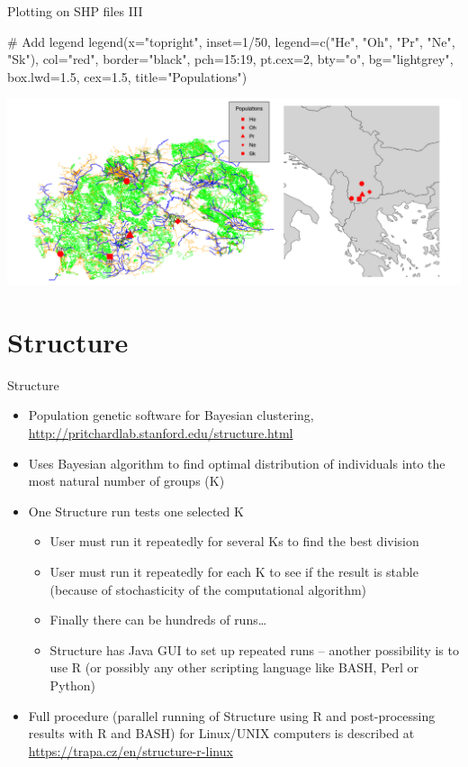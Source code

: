 \documentclass[compress, ucs, xelatex, 11pt, xcolor=svgnames,
  hyperref={
    bookmarks=true,
    unicode=true,
    colorlinks=true,
    pdftitle={Molecular data in R},
    plainpages=false,
    pdfauthor={Vojtech Zeisek},
    pdfsubject={Course about phylogeny and evolution in R},
    pdfcreator={XeLaTeX},
    pdfkeywords={R, evolution, phylogeny, molecular data},
    linkcolor=Tomato,
    anchorcolor=SaddleBrown,
    citecolor=Goldenrod,
    filecolor=DarkMagenta,
    menucolor=Sienna,
    urlcolor=DarkTurquoise,
    pdftex},
  url={hyphens, lowtilde} %
  ]{beamer}
\begin{document}
\begin{frame}[fragile]{Plotting on SHP files III}
  \begin{spluscode}
    # Add legend
    legend(x="topright", inset=1/50, legend=c("He", "Oh", "Pr", "Ne",
      "Sk"), col="red", border="black", pch=15:19, pt.cex=2, bty="o",
      bg="lightgrey", box.lwd=1.5, cex=1.5, title="Populations")
  \end{spluscode}
\includegraphics[width=\textwidth]{mapy.png}
\end{frame}

\section{Structure}

\begin{frame}{Structure}
\begin{itemize}
  \item Population genetic software for Bayesian clustering, \url{http://pritchardlab.stanford.edu/structure.html}
  \item Uses Bayesian algorithm to find optimal distribution of individuals into the most natural number of groups (K)
  \item One Structure run tests one selected K
  \begin{itemize}
    \item User must run it repeatedly for several Ks to find the best division
    \item User must run it repeatedly for each K to see if the result is stable (because of stochasticity of the computational algorithm)
    \item Finally there can be hundreds of runs\ldots
    \item Structure has Java GUI to set up repeated runs -- another possibility is to use R (or possibly any other scripting language like BASH, Perl or Python)
  \end{itemize}
  \item Full procedure (parallel running of Structure using R and post-processing results with R and BASH) for Linux/UNIX computers is described at \url{https://trapa.cz/en/structure-r-linux}
\end{itemize}
\end{frame}
\end{document}

